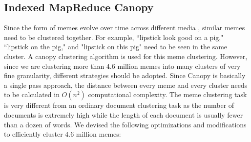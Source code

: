 \documentclass{sig-alternate}
\begin{document}
\subsection{Indexed MapReduce Canopy}
Since the form of memes evolve over time across different media \cite{Leskovec2009}, similar memes need to be clustered together. For example, ``lipstick look good on a pig," ``lipstick on the pig," and "lipstick on this pig" need to be seen in the same cluster. A canopy clustering algorithm \cite{McCallum2000} is used for this meme clustering. However, since we are clustering more than 4.6 million memes into many clusters of very fine granularity, different strategies should be adopted. Since Canopy is basically a single pass approach, the distance between every meme and every cluster needs to be calculated in $O(n^2)$ computational complexity. The meme clustering task is very different from an ordinary document clustering task as the number of documents is extremely high while the length of each document is usually fewer than a dozen of words. We devised the following optimizations and modifications to efficiently cluster 4.6 million memes:
\end{document}
